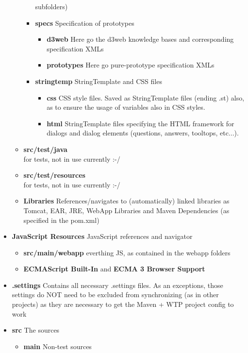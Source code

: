 \documentclass[a4paper,10pt]{scrreprt}
\begin{document}
\begin{footnotesize}
\begin{itemize}
\begin{itemize}
\begin{itemize}
			subfolders)
			\item \textbf{specs} Specification of prototypes
			\begin{itemize}
				\item \textbf{d3web} Here go the d3web knowledge bases and corresponding specification XMLs 
				\item \textbf{prototypes} Here go pure-prototype specification XMLs
			\end{itemize}
			\item \textbf{stringtemp} StringTemplate and CSS files
			\begin{itemize}
				\item \textbf{css} CSS style files. Saved as StringTemplate files (ending .st) also, as to ensure
				the usage of variables also in CSS styles.
				\item \textbf{html} StringTemplate files specifying the HTML framework for dialogs and dialog elements (questions, answers, tooltops, etc...).
			\end{itemize}
		\end{itemize}
		\item \textbf{src/test/java} \\
		for tests, not in use currently :-/
		\item \textbf{src/test/resources}\\
		for tests, not in use currently :-/
		\item \textbf{Libraries} References/navigates to (automatically) linked libraries as Tomcat, EAR, JRE, WebApp 
		Libraries and Maven Dependencies (as specified in the pom.xml)
	\end{itemize}
	\item \textbf{JavaScript Resources} JavaScript references and navigator
	\begin{itemize}
		\item \textbf{src/main/webapp} everthing JS, as contained in the webapp folders
		\item \textbf{ECMAScript Built-In} and \textbf{ECMA 3 Browser Support}
	\end{itemize}
	\item \textbf{.settings} Contains all necessary .settings files. As an exceptions, those settings do NOT need to be excluded from synchronizing (as in other projects) as they are necessary to get the Maven + WTP project config to work
	\item \textbf{src} The sources
	\begin{itemize}
		\item \textbf{main} Non-test sources

\end{itemize}
\end{itemize}
\end{footnotesize}
\end{document}

